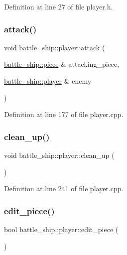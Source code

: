 Definition at line 27 of file player.\+h.

\mbox{\label{classbattle__ship_1_1player_aefb7ecb4869022d06472b9a9f961020c}} 
\subsubsection{\texorpdfstring{attack()}{attack()}}
{\footnotesize\ttfamily void battle\+\_\+ship\+::player\+::attack (\begin{DoxyParamCaption}\item[{\hyperlink{classbattle__ship_1_1piece}{battle\+\_\+ship\+::piece} \&}]{attacking\+\_\+piece,  }\item[{\hyperlink{classbattle__ship_1_1player}{battle\+\_\+ship\+::player} \&}]{enemy }\end{DoxyParamCaption})}



Definition at line 177 of file player.\+cpp.

\mbox{\label{classbattle__ship_1_1player_ace54ae4286cbbaca8a8f4b6fe2a75de0}} 
\subsubsection{\texorpdfstring{clean\+\_\+up()}{clean\_up()}}
{\footnotesize\ttfamily void battle\+\_\+ship\+::player\+::clean\+\_\+up (\begin{DoxyParamCaption}{ }\end{DoxyParamCaption})}



Definition at line 241 of file player.\+cpp.

\mbox{\label{classbattle__ship_1_1player_af7524f337fabec20fe8f0ae3288cf9bb}} 
\subsubsection{\texorpdfstring{edit\+\_\+piece()}{edit\_piece()}}
{\footnotesize\ttfamily bool battle\+\_\+ship\+::player\+::edit\+\_\+piece (\begin{DoxyParamCaption}{ }\end{DoxyParamCaption})}



